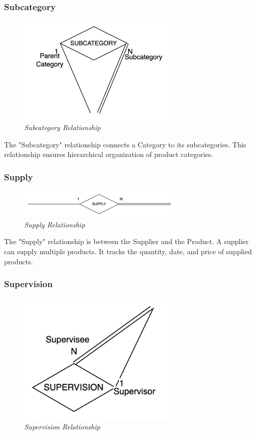 \subsubsection{Subcategory}
\begin{figure}[H]
  \centering
  \includegraphics[width=0.7\textwidth]{images/relationships/subcategory.png}
  \caption{\textit{Subcategory Relationship}}
\end{figure}

The "Subcategory" relationship connects a Category to its subcategories. This relationship ensures hierarchical organization of product categories.

\subsubsection{Supply}
\begin{figure}[H]
  \centering
  \includegraphics[width=0.7\textwidth]{images/relationships/supply.png}
  \caption{\textit{Supply Relationship}}
\end{figure}

The "Supply" relationship is between the Supplier and the Product. A supplier can supply multiple products. It tracks the quantity, date, and price of supplied products.

\subsubsection{Supervision}
\begin{figure}[H]
  \centering
  \includegraphics[width=0.7\textwidth]{images/relationships/supervision.png}
  \caption{\textit{Supervision Relationship}}
\end{figure}


